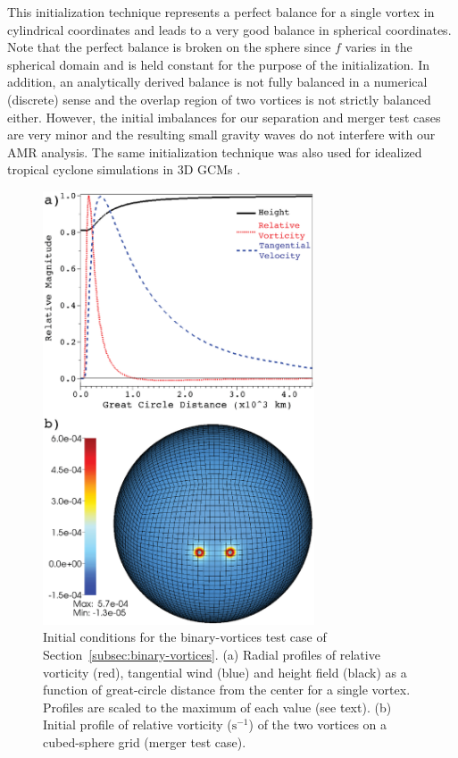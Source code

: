 This initialization technique represents a perfect balance for a single vortex in cylindrical coordinates and leads to a
very good balance in spherical coordinates. Note that the perfect balance is broken on the sphere since
$f$ varies in the spherical domain and is held constant for the purpose of the initialization. In addition,
an analytically derived balance is not fully balanced in a numerical (discrete) sense and
 the overlap region of two vortices is not strictly balanced either. 
 However, the initial imbalances for our separation and 
 merger test cases are very minor and the resulting small gravity waves do not
interfere with our AMR analysis. The same initialization technique was
also used for idealized tropical cyclone simulations in 3D GCMs \citep{reed2011vortex}.
%
\begin{figure}
    \centerline{%
    \noindent
    \includegraphics[width=19pc]{Chap1/bvort_setup.eps}}
    \caption{Initial conditions for the binary-vortices test case of
Section~\ref{subsec:binary-vortices}.
    (a) Radial profiles of relative vorticity (red), tangential wind (blue) and
    height field (black) as a function of great-circle distance from the
    center for a single vortex.  Profiles are scaled to the maximum of each
    value (see text).  (b) Initial profile of relative vorticity
    ($\mathrm{s}^{-1}$) of the two vortices on a cubed-sphere grid (merger test case).}%
    \label{fig:bvort_setup}
\end{figure}
